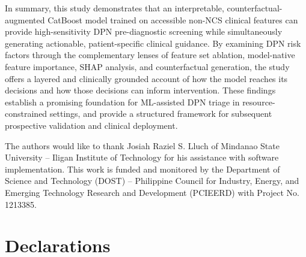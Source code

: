 \documentclass[pdflatex,sn-vancouver-num]{sn-jnl}
\begin{document}
In summary, this study demonstrates that an interpretable, counterfactual-augmented CatBoost model trained on accessible non-NCS clinical features can provide high-sensitivity DPN pre-diagnostic screening while simultaneously generating actionable, patient-specific clinical guidance. By examining DPN risk factors through the complementary lenses of feature set ablation, model-native feature importance, SHAP analysis, and counterfactual generation, the study offers a layered and clinically grounded account of how the model reaches its decisions and how those decisions can inform intervention. These findings establish a promising foundation for ML-assisted DPN triage in resource-constrained settings, and provide a structured framework for subsequent prospective validation and clinical deployment.
\backmatter


The authors would like to thank Josiah Raziel S. Lluch of Mindanao State University -- Iligan Institute of Technology for his assistance with software implementation. This work is funded and monitored by the Department of Science and Technology (DOST) -- Philippine Council for Industry, Energy, and Emerging Technology Research and Development (PCIEERD) with Project No. 1213385.

\section*{Declarations}

\end{document}

